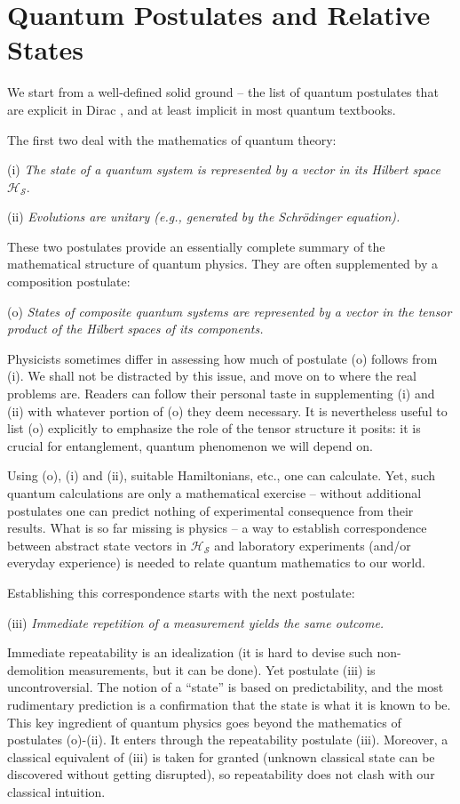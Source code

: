 \documentclass[aps,amsmath,amssymb,amsfonts,floatfix]{revtex4-1}
\newcommand{\cH}        {{\mathcal H}}
\newcommand{\cS}        {{\mathcal S}}
\newcommand{\+}         {\dagger}
\begin{document}
\section{Quantum Postulates and Relative States}

We start from a well-defined solid ground -- the
list of quantum postulates that are explicit in Dirac \cite{11}, and at least implicit in most quantum textbooks.

The first two deal with the mathematics of quantum theory:

(i) {\it The state of a quantum system is represented by a vector in its Hilbert space} $\cH_{\cS}$.

(ii) {\it Evolutions are unitary (e.g., generated by the Schr\"odinger equation).}

These two postulates provide an essentially complete summary of the mathematical structure of quantum physics.
They are often \cite{21,22} supplemented by a composition postulate: 

(o) {\it States of composite quantum systems are represented by a vector in the tensor product of the Hilbert spaces of its components.}

Physicists sometimes differ in assessing how much of postulate (o) follows from (i).
We shall not be distracted by this issue, and move on to where the real problems are.  Readers
can follow their personal taste in supplementing (i) and (ii) with whatever portion of (o) they deem
necessary. It is nevertheless useful to list (o) explicitly to emphasize the role of the tensor structure it posits: it is crucial for entanglement, quantum phenomenon we will depend on.

Using (o), (i) and (ii), suitable Hamiltonians, etc., one can calculate. Yet, such quantum calculations are only a mathematical exercise 
-- without additional postulates one can predict nothing of experimental consequence from their results. What is so far missing is physics -- a way to establish correspondence 
between abstract state vectors in $\cH_{\cS}$ and laboratory experiments 
(and/or everyday experience) is needed to relate quantum mathematics to our world. 

Establishing this correspondence starts with the next postulate:

(iii) {\it Immediate repetition of a measurement yields the same outcome.}

Immediate repeatability is an idealization (it is hard to devise such non-demolition measurements, but it
can be done). Yet postulate (iii) is uncontroversial. The notion of a ``state'' is based on predictability, and the most rudimentary prediction is 
a confirmation that the state is what it is known to be. This key ingredient of quantum physics goes beyond the mathematics of postulates (o)-(ii). It enters through the repeatability postulate (iii). Moreover, a classical equivalent of 
(iii) is taken for granted (unknown classical state can be discovered without getting disrupted), so repeatability does not clash with our classical intuition.
\end{document}
